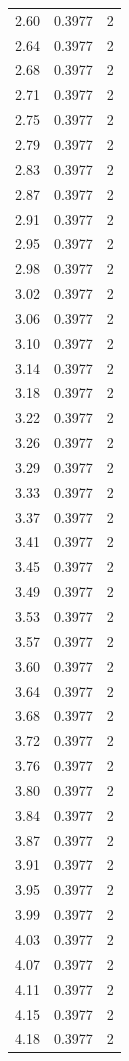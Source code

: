 \begin{longtable}{lrr}
  2.60 & 0.3977 & 2 \\
  2.64 & 0.3977 & 2 \\
  2.68 & 0.3977 & 2 \\
  2.71 & 0.3977 & 2 \\
  2.75 & 0.3977 & 2 \\
  2.79 & 0.3977 & 2 \\
  2.83 & 0.3977 & 2 \\
  2.87 & 0.3977 & 2 \\
  2.91 & 0.3977 & 2 \\
  2.95 & 0.3977 & 2 \\
  2.98 & 0.3977 & 2 \\
  3.02 & 0.3977 & 2 \\
  3.06 & 0.3977 & 2 \\
  3.10 & 0.3977 & 2 \\
  3.14 & 0.3977 & 2 \\
  3.18 & 0.3977 & 2 \\
  3.22 & 0.3977 & 2 \\
  3.26 & 0.3977 & 2 \\
  3.29 & 0.3977 & 2 \\
  3.33 & 0.3977 & 2 \\
  3.37 & 0.3977 & 2 \\
  3.41 & 0.3977 & 2 \\
  3.45 & 0.3977 & 2 \\
  3.49 & 0.3977 & 2 \\
  3.53 & 0.3977 & 2 \\
  3.57 & 0.3977 & 2 \\
  3.60 & 0.3977 & 2 \\
  3.64 & 0.3977 & 2 \\
  3.68 & 0.3977 & 2 \\
  3.72 & 0.3977 & 2 \\
  3.76 & 0.3977 & 2 \\
  3.80 & 0.3977 & 2 \\
  3.84 & 0.3977 & 2 \\
  3.87 & 0.3977 & 2 \\
  3.91 & 0.3977 & 2 \\
  3.95 & 0.3977 & 2 \\
  3.99 & 0.3977 & 2 \\
  4.03 & 0.3977 & 2 \\
  4.07 & 0.3977 & 2 \\
  4.11 & 0.3977 & 2 \\
  4.15 & 0.3977 & 2 \\
  4.18 & 0.3977 & 2 \\

\end{longtable}
